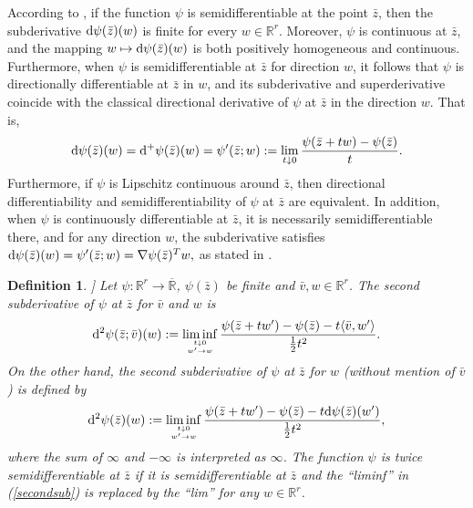 \documentclass[11pt]{article}
\numberwithin{equation}{section}
\newtheorem{definition}{Definition}[section]
\begin{document}
{According to \cite[Theorem 7.21]{RoWe98}, if the function $\psi$ is semidifferentiable at the point $\bar{z}$, then the subderivative ${\rm d}\psi(\bar{z})(w)$ is finite for every $w \in \mathbb{R}^r$. Moreover, $\psi$ is continuous at $\bar{z}$, and the mapping $w \mapsto {\rm d}\psi(\bar{z})(w)$ is both positively homogeneous and continuous. Furthermore, when $\psi$ is semidifferentiable at $\bar{z}$ for direction $w$, it follows that $\psi$ is directionally differentiable at $\bar{z}$ in $w$, and its subderivative and superderivative coincide with the classical directional derivative of $\psi$ at $\bar{z}$ in the direction $w$. That is,
\begin{equation*}{\rm d}\psi(\bar z)(w)={\rm d}^+\psi (\bar z)(w)=\psi'(\bar z; w):=\lim _{t \downarrow 0} \frac{\psi(\bar z+t w)-\psi(\bar z)}{t}.\label{eqn2.2}\end{equation*}
Furthermore, if $\psi$ is Lipschitz continuous around $\bar z$, then directional differentiability and semidifferentiability of $\psi$ at $\bar{z}$ are equivalent. In addition, when $\psi$ is continuously differentiable at $\bar{z}$, it is necessarily semidifferentiable there, and for any direction $w$, the subderivative satisfies  $ {\rm d}\psi(\bar{z})(w) = \psi'(\bar{z}; w) = \nabla \psi(\bar{z})^{T} w,$ as stated in \cite[Exercise 8.20]{RoWe98}.
 

\begin{definition}\label{def2.6}  ] Let $\psi: \mathbb{R}^r \rightarrow \overline{\mathbb{R}}$, $\psi(\bar z)$ be finite and $\bar v, w\in  \mathbb{R}^r$. The second subderivative  of $\psi$ at $\bar z$ for $\bar v$  and $w$ is
 \begin{eqnarray*}
 {\rm d}^2\psi(\bar z;\bar v)(w):= \liminf\limits_{{t\downarrow 0} \atop {w'\to w}} \frac{\psi(\bar{z}+tw')-\psi(\bar{z})-t\langle \bar{v}, w'\rangle}{\frac{1}{2}t^2}.
\end{eqnarray*}
On the other hand, the second subderivative  of $\psi$ at $\bar z$ for $w$ (without mention of $\bar v$) is defined by
 \begin{eqnarray}\label{secondsub}
 {\rm d}^2\psi(\bar z)(w):= \liminf\limits_{{t\downarrow 0} \atop {w'\to w}} \frac{\psi(\bar{z}+tw')-\psi(\bar{z})-t {\rm d} \psi(\bar z)(w')}{\frac{1}{2}t^2},
\end{eqnarray}
where the sum of $\infty$ and $-\infty$ is interpreted as $\infty$.
The function $\psi$ is twice semidifferentiable at $\bar z$ if it is semidifferentiable at $\bar z$ and  the ``liminf'' in  (\ref{secondsub}) is replaced by the ``lim''
 for any $w \in  \mathbb{R}^r$.
 \end{definition}

}
\end{document}
